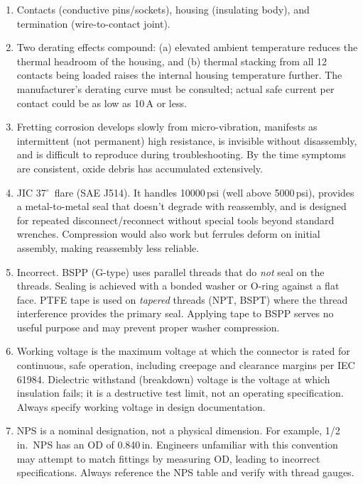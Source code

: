 \begin{enumerate}[leftmargin=1.5em]
  \item Contacts (conductive pins/sockets), housing (insulating body), and termination (wire-to-contact joint).

  \item Two derating effects compound: (a) elevated ambient temperature reduces the thermal headroom of the housing, and (b) thermal stacking from all 12 contacts being loaded raises the internal housing temperature further. The manufacturer's derating curve must be consulted; actual safe current per contact could be as low as 10\,A or less.

  \item Fretting corrosion develops slowly from micro-vibration, manifests as intermittent (not permanent) high resistance, is invisible without disassembly, and is difficult to reproduce during troubleshooting. By the time symptoms are consistent, oxide debris has accumulated extensively.

  \item JIC 37$^{\circ}$\ flare (SAE J514). It handles 10000\,psi (well above 5000\,psi), provides a metal-to-metal seal that doesn't degrade with reassembly, and is designed for repeated disconnect/reconnect without special tools beyond standard wrenches. Compression would also work but ferrules deform on initial assembly, making reassembly less reliable.

  \item Incorrect. BSPP (G-type) uses parallel threads that do \emph{not} seal on the threads. Sealing is achieved with a bonded washer or O-ring against a flat face. PTFE tape is used on \emph{tapered} threads (NPT, BSPT) where the thread interference provides the primary seal. Applying tape to BSPP serves no useful purpose and may prevent proper washer compression.

  \item Working voltage is the maximum voltage at which the connector is rated for continuous, safe operation, including creepage and clearance margins per IEC 61984. Dielectric withstand (breakdown) voltage is the voltage at which insulation fails; it is a destructive test limit, not an operating specification. Always specify working voltage in design documentation.

  \item NPS is a nominal designation, not a physical dimension. For example, 1/2\,in.\ NPS has an OD of 0.840\,in. Engineers unfamiliar with this convention may attempt to match fittings by measuring OD, leading to incorrect specifications. Always reference the NPS table and verify with thread gauges.


\end{enumerate}
